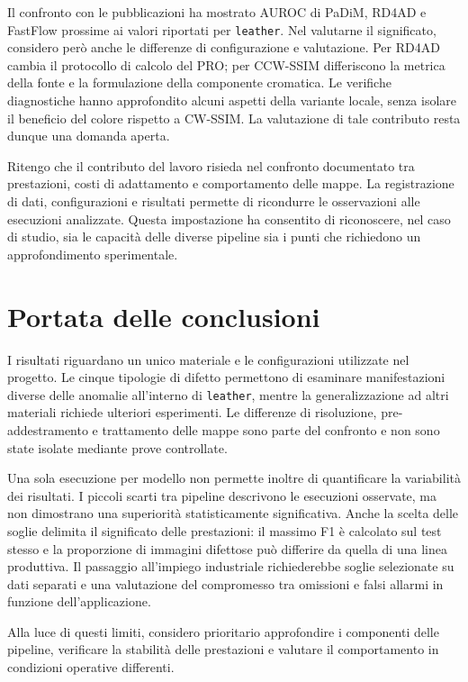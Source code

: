 Il confronto con le pubblicazioni ha mostrato AUROC di PaDiM, RD4AD e FastFlow prossime ai valori riportati per \texttt{leather}. Nel valutarne il significato, considero però anche le differenze di configurazione e valutazione. Per RD4AD cambia il protocollo di calcolo del PRO; per CCW-SSIM differiscono la metrica della fonte e la formulazione della componente cromatica. Le verifiche diagnostiche hanno approfondito alcuni aspetti della variante locale, senza isolare il beneficio del colore rispetto a CW-SSIM. La valutazione di tale contributo resta dunque una domanda aperta.

Ritengo che il contributo del lavoro risieda nel confronto documentato tra prestazioni, costi di adattamento e comportamento delle mappe. La registrazione di dati, configurazioni e risultati permette di ricondurre le osservazioni alle esecuzioni analizzate. Questa impostazione ha consentito di riconoscere, nel caso di studio, sia le capacità delle diverse pipeline sia i punti che richiedono un approfondimento sperimentale.

\section{Portata delle conclusioni}

I risultati riguardano un unico materiale e le configurazioni utilizzate nel progetto. Le cinque tipologie di difetto permettono di esaminare manifestazioni diverse delle anomalie all'interno di \texttt{leather}, mentre la generalizzazione ad altri materiali richiede ulteriori esperimenti. Le differenze di risoluzione, pre-addestramento e trattamento delle mappe sono parte del confronto e non sono state isolate mediante prove controllate.

Una sola esecuzione per modello non permette inoltre di quantificare la variabilità dei risultati. I piccoli scarti tra pipeline descrivono le esecuzioni osservate, ma non dimostrano una superiorità statisticamente significativa. Anche la scelta delle soglie delimita il significato delle prestazioni: il massimo F1 è calcolato sul test stesso e la proporzione di immagini difettose può differire da quella di una linea produttiva. Il passaggio all'impiego industriale richiederebbe soglie selezionate su dati separati e una valutazione del compromesso tra omissioni e falsi allarmi in funzione dell'applicazione.

Alla luce di questi limiti, considero prioritario approfondire i componenti delle pipeline, verificare la stabilità delle prestazioni e valutare il comportamento in condizioni operative differenti.

